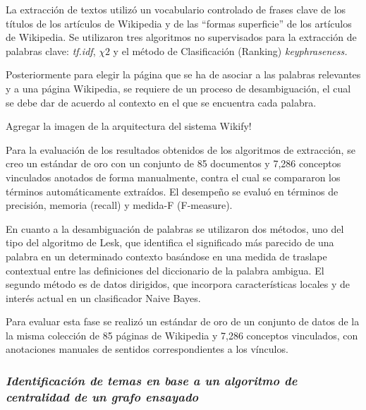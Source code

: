 \documentclass[letterpaper]{article}
\begin{document}
{\sffamily
La extracci\'on de textos utiliz\'o un vocabulario controlado de frases
clave de los t\'itulos de los art\'iculos de Wikipedia y de las
{\textquotedblleft}formas superficie{\textquotedblright} de los
art\'iculos de Wikipedia. Se utilizaron tres algoritmos no supervisados
para la extracci\'on de palabras clave: \textit{tf.idf},  $\chi 2$ y el
m\'etodo de Clasificaci\'on (Ranking) \textit{keyphraseness}\textit{.}}


\bigskip

{\sffamily
Posteriormente para elegir la p\'agina que se ha de asociar a las
palabras relevantes y a una p\'agina Wikipedia, se requiere de un
proceso de desambiguaci\'on, el cual se debe dar de acuerdo al contexto
en el que se encuentra cada palabra.}

{\sffamily
Agregar la imagen de la arquitectura del sistema Wikify!}


\bigskip

{\sffamily
Para la evaluaci\'on de los resultados obtenidos de los algoritmos de
extracci\'on, se creo un est\'andar de oro con un conjunto de 85
documentos y 7,286 conceptos vinculados anotados de forma manualmente,
contra el cual se compararon los t\'erminos autom\'aticamente
extra\'idos. El desempe\~no se evalu\'o en t\'erminos de precisi\'on,
memoria (recall) y medida-F (F-measure).}

{\sffamily
En cuanto a la desambiguaci\'on de palabras se utilizaron dos m\'etodos,
uno del tipo del algoritmo de Lesk, que identifica el significado m\'as
parecido de una palabra en un determinado contexto bas\'andose en una
medida de traslape contextual entre las definiciones del diccionario de
la palabra ambigua. El segundo m\'etodo es de datos dirigidos, que
incorpora caracter\'isticas locales y de inter\'es actual en un
clasificador Naive Bayes.}


\bigskip

{\sffamily
Para evaluar esta fase se realiz\'o un est\'andar de oro de un conjunto
de datos de la la misma colecci\'on de 85 p\'aginas de Wikipedia y
7,286 conceptos vinculados, con anotaciones manuales de sentidos
correspondientes a los v\'inculos.}

\clearpage\subsubsection[Identificaci\'on de temas en base a un
algoritmo de centralidad de un grafo
ensayado]{\sffamily\itshape Identificaci\'on de
temas en base a un algoritmo de centralidad de un grafo ensayado}
\end{document}
